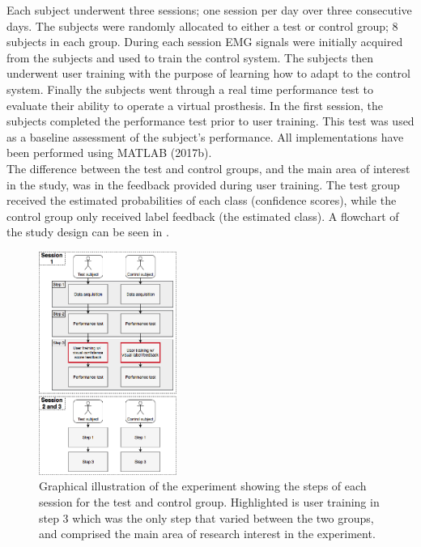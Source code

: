 
Each subject underwent three sessions; one session per day over three consecutive days. The subjects were randomly allocated to either a test or control group; 8 subjects in each group. During each session EMG signals were initially acquired from the subjects and used to train the control system. The subjects then underwent user training with the purpose of learning how to adapt to the control system. Finally the subjects went through a real time performance test to evaluate their ability to operate a virtual prosthesis. In the first session, the subjects completed the performance test prior to user training. This test was used as a baseline assessment of the subject's performance. All implementations have been performed using MATLAB (2017b). \\
The difference between the test and control groups, and the main area of interest in the study, was in the feedback provided during user training. The test group received the estimated probabilities of each class (confidence scores), while the control group only received label feedback (the estimated class). A flowchart of the study design can be seen in .

\vspace{0.1cm}

\begin{figure}[H]                                         
	\includegraphics[width=0.40\textwidth]{figures/Paper/Study_design}  
	\caption{Graphical illustration of the experiment showing the steps of each session for the test and control group. Highlighted is user training in step 3 which was the only step that varied between the two groups, and comprised the main area of research interest in the experiment.}
	\label{fig:P:std} 
\end{figure}
\vspace{-0.7cm}
